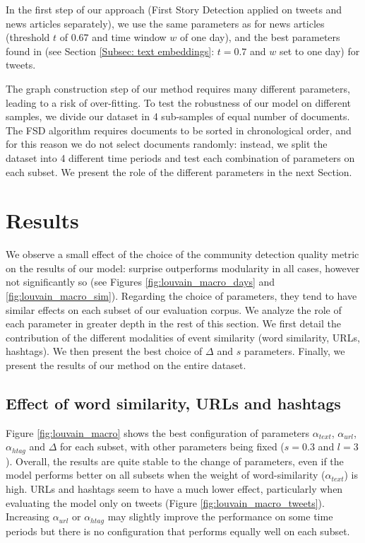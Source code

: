 In the first step of our approach (First Story Detection applied on tweets and news articles separately), we use the same parameters as \cite{cage2020production} for news articles (threshold $t$ of $0.67$ and time window $w$ of one day), and the best parameters found in  \cite{mazoyer2020french} (see Section \ref{Subsec: text embeddings}: $t=0.7$ and $w$ set to one day) for tweets.

The graph construction step of our method requires many different parameters, leading to a risk of over-fitting. To test the robustness of our model on different samples, we divide our dataset in 4 sub-samples of equal number of documents. The FSD algorithm requires documents to be sorted in chronological order, and for this reason we do not select documents randomly: instead, we split the dataset into 4 different time periods and test each combination of parameters on each subset. We present the role of the different parameters in the next Section.

\section{Results}


We observe a small effect of the choice of the community detection quality metric on the results of our model: surprise outperforms modularity in all cases, however not significantly so (see Figures \ref{fig:louvain_macro_days} and \ref{fig:louvain_macro_sim}). Regarding the choice of parameters, they tend to have similar effects on each subset of our evaluation corpus. We analyze the role of each parameter in greater depth in the rest of this section. We first detail the contribution of the different modalities of event similarity (word similarity, URLs, hashtags). We then present the best choice of $\Delta$ and $s$ parameters. Finally, we present the results of our method on the entire dataset.

\subsection{Effect of word similarity, URLs and hashtags}
Figure \ref{fig:louvain_macro} shows 
the best configuration of parameters $\alpha_{text}$, $\alpha_{url}$, $\alpha_{htag}$ and $\Delta$ for each subset, with other parameters being fixed ($s = 0.3$ and $l = 3$). Overall, the results are quite stable to the change of parameters, even if the model performs better on all subsets when the weight of word-similarity ($\alpha_{text}$) is high. URLs and hashtags seem to have a much lower effect, particularly when evaluating the model only on tweets (Figure \ref{fig:louvain_macro_tweets}). Increasing $\alpha_{url}$ or $\alpha_{htag}$ may slightly improve the performance on some time periods  but there is no configuration that performs equally well on each subset.


